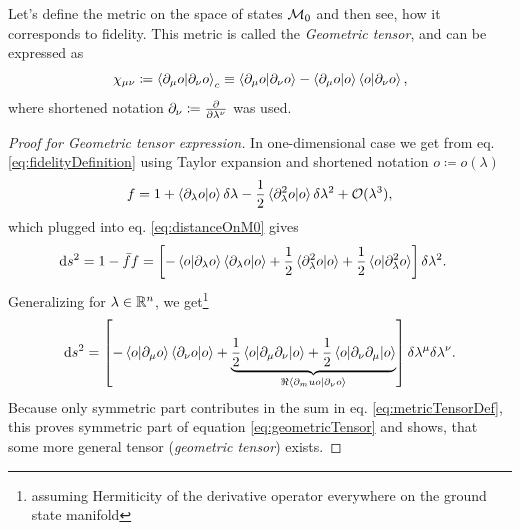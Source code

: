 Let's define the metric on the space of states $\mathcal{M}_0$ and then see, how it corresponds to fidelity. This metric is called the \emph{Geometric tensor}, and can be expressed as 
\begin{equation}
    \chi_{\mu\nu}\coloneqq \braket{\partial_\mu o|\partial_\nu o}_c \equiv \braket{\partial_\mu o|\partial_\nu o} - \braket{\partial_\mu o|o}\braket{o|\partial_\nu o},
    \label{eq:geometricTensor}
\end{equation}
where shortened notation $\partial_\nu\coloneqq\frac{\partial }{\partial \lambda^\nu}$ was used. 

\begin{proof}[Proof for Geometric tensor expression] In one-dimensional case we get from eq. \ref{eq:fidelityDefinition} using Taylor expansion and shortened notation $o\coloneqq o(\lambda)$
    \begin{equation}
        f=1+\braket{\partial_\lambda o|o}\delta\lambda-\frac{1}{2}\braket{\partial_\lambda^2 o|o}\delta\lambda^2+\mathcal{O}(\lambda^3),
    \end{equation}
    which plugged into eq. \ref{eq:distanceOnM0} gives
    \begin{equation}
        \begin{split}
            \mathrm{d} s^2&=1-\bar{f}f=\left[-\braket{o|\partial_\lambda o}\braket{\partial_\lambda o|o}+\frac{1}{2}\braket{\partial_\lambda^2 o|o}+\frac{1}{2}\braket{o|\partial_\lambda^2 o}\right]\delta \lambda^2.
        \end{split}
    \end{equation}
    Generalizing for $\lambda\in \mathbb{R}^n$, we get\footnote{assuming Hermiticity of the derivative operator everywhere on the ground state manifold}
    \begin{equation}
        \mathrm{d} s^2=\left[-\braket{o|\partial_\mu o}\braket{\partial_\nu o|o}+\underbrace{\frac{1}{2}\braket{o|\partial_\mu \partial_\nu|o}+\frac{1}{2}\braket{o|\partial_\nu \partial_\mu| o}}_{\Re\braket{\partial_mu o|\partial_\nu o}}\right]\delta \lambda^\mu\delta \lambda^\nu.
    \end{equation}
    Because only symmetric part contributes in the sum in eq. \ref{eq:metricTensorDef}, this proves symmetric part of equation \ref{eq:geometricTensor} and shows, that some more general tensor (\emph{geometric tensor}) exists.
\end{proof}

